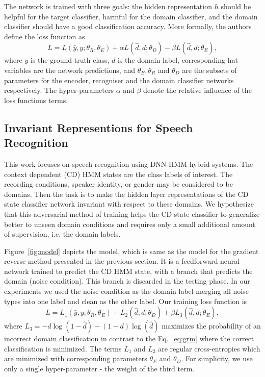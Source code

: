 \documentclass{article}
\begin{document}
    The network is trained with three goals: the hidden representation $h$ should
    be helpful for the target classifier, harmful for the domain classifier,
    and the domain classifier should have a good classification accuracy. More 
    formally, the authors define the loss function as
    \begin{equation}
        L = L(\hat{y}, y; \theta_R, \theta_E) + 
        \alpha L(\hat{d}, d; \theta_D) -
        \beta L(\hat{d}, d; \theta_E),
        \label{eq:grm}
    \end{equation}
    where $y$ is the ground truth class, $d$ is the domain label, corresponding
    hat variables are the network predictions, and $\theta_E, \theta_R$ and $\theta_D$ are the subsets of  parameters for the encoder,
    recogniser and the domain classifier networks respectively. The hyper-parameters
    $\alpha$ and $\beta$ denote the relative influence of the loss functions terms.

\subsection{Invariant Representions for Speech Recognition}
\label{sec:invariant-speech}

This work focuses on speech recognition using DNN-HMM hybrid systems. The context dependent (CD) HMM states are the class labels of interest. The
recording conditions, speaker identity, or gender may be considered to be domains. Then the task is to make the hidden layer representations of the CD state classifier network 
invariant with respect to these domains. We hypothesize that this adversarial method of
training helps the CD state classifier to generalize better to unseen domain conditions and requires only a  
small additional amount of supervision, i.e. the domain labels.  

Figure~\ref{fig:model} depicts the model, which is same as the model for the gradient reverse method presented in the previous section. It is a feedforward neural network trained to predict the CD HMM state, with a branch that predicts the domain (noise condition). This branch is discarded in the testing phase. In our experiments we
used the noise condition as the domain label merging all noise types into one label
and clean as the other label. Our training loss function is
    \begin{equation}
        L = L_1(\hat{y}, y; \theta_R, \theta_E) + 
        L_2(\hat{d}, d; \theta_D) +
        \beta L_3(\hat{d}, d; \theta_E),
        \label{eq:cost}
    \end{equation}
where $L_3 = - d\log(1 - \hat{d}) - (1-d)\log(\hat{d})$ maximizes the probability
of an incorrect domain classification in contrast to the Eq.~\ref{eq:grm} where the 
correct classification is minimized.
The terms $L_1$ and $L_2$ are 
regular cross-entropies which are minimized with corresponding parameters $\theta_E$ and $\theta_D$.
For simplicity, we use only a single hyper-parameter - the weight of the third term.
\end{document}
